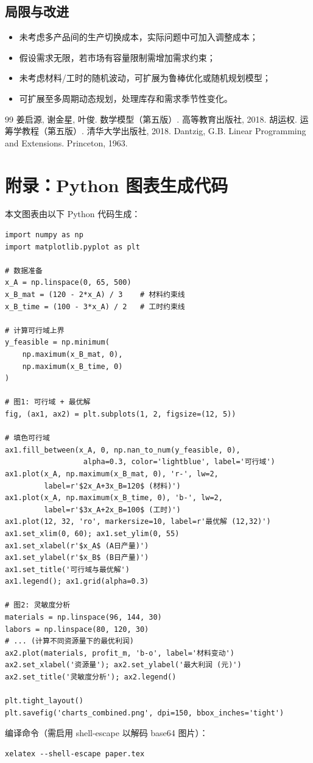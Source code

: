\documentclass[12pt,a4paper]{ctexart}
\begin{document}
\subsection{局限与改进}
\begin{itemize}
\item 未考虑多产品间的生产切换成本，实际问题中可加入调整成本；
\item 假设需求无限，若市场有容量限制需增加需求约束；
\item 未考虑材料/工时的随机波动，可扩展为鲁棒优化或随机规划模型；
\item 可扩展至多周期动态规划，处理库存和需求季节性变化。
\end{itemize}

\begin{thebibliography}{99}
 姜启源, 谢金星, 叶俊. 数学模型（第五版）. 高等教育出版社, 2018.
 胡运权. 运筹学教程（第五版）. 清华大学出版社, 2018.
 Dantzig, G.B. Linear Programming and Extensions. Princeton, 1963.
\end{thebibliography}

\newpage
\section*{附录：Python 图表生成代码}
本文图表由以下 Python 代码生成：

\begin{verbatim}
import numpy as np
import matplotlib.pyplot as plt

# 数据准备
x_A = np.linspace(0, 65, 500)
x_B_mat = (120 - 2*x_A) / 3    # 材料约束线
x_B_time = (100 - 3*x_A) / 2   # 工时约束线

# 计算可行域上界
y_feasible = np.minimum(
    np.maximum(x_B_mat, 0),
    np.maximum(x_B_time, 0)
)

# 图1: 可行域 + 最优解
fig, (ax1, ax2) = plt.subplots(1, 2, figsize=(12, 5))

# 填色可行域
ax1.fill_between(x_A, 0, np.nan_to_num(y_feasible, 0),
                  alpha=0.3, color='lightblue', label='可行域')
ax1.plot(x_A, np.maximum(x_B_mat, 0), 'r-', lw=2,
         label=r'$2x_A+3x_B=120$ (材料)')
ax1.plot(x_A, np.maximum(x_B_time, 0), 'b-', lw=2,
         label=r'$3x_A+2x_B=100$ (工时)')
ax1.plot(12, 32, 'ro', markersize=10, label=r'最优解 (12,32)')
ax1.set_xlim(0, 60); ax1.set_ylim(0, 55)
ax1.set_xlabel(r'$x_A$ (A日产量)')
ax1.set_ylabel(r'$x_B$ (B日产量)')
ax1.set_title('可行域与最优解')
ax1.legend(); ax1.grid(alpha=0.3)

# 图2: 灵敏度分析
materials = np.linspace(96, 144, 30)
labors = np.linspace(80, 120, 30)
# ... (计算不同资源量下的最优利润)
ax2.plot(materials, profit_m, 'b-o', label='材料变动')
ax2.set_xlabel('资源量'); ax2.set_ylabel('最大利润 (元)')
ax2.set_title('灵敏度分析'); ax2.legend()

plt.tight_layout()
plt.savefig('charts_combined.png', dpi=150, bbox_inches='tight')
\end{verbatim}

编译命令（需启用 shell-escape 以解码 base64 图片）：
\begin{verbatim}
xelatex --shell-escape paper.tex
\end{verbatim}
\end{document}
